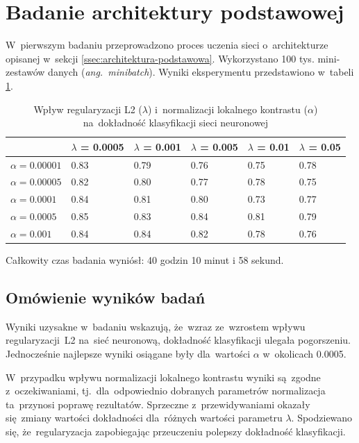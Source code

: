 \section{Badanie architektury podstawowej} \label{sec:badanie-1}
W~pierwszym badaniu przeprowadzono proces uczenia sieci o~architekturze opisanej w~sekcji
\ref{ssec:architektura-podstawowa}. Wykorzystano 100 tys. mini-zestawów danych (\textit{ang.~minibatch}).
Wyniki eksperymentu przedstawiono w~tabeli \ref{table:wyniki1}.

\begin{table}[H]
    \centering
    \begin{tabular}{|l|l|l|l|l|l|}
      \hline
                       & $\lambda$ = 0.0005 & $\lambda$ = 0.001 & $\lambda$ = 0.005 & $\lambda$ = 0.01 & $\lambda$ = 0.05 \\
      \hline
      $\alpha=0.00001$ & 0.83 & 0.79 & 0.76 & 0.75 & 0.78 \\
      \hline
      $\alpha=0.00005$ & 0.82 & 0.80 & 0.77 & 0.78 & 0.75 \\
      \hline
      $\alpha=0.0001$  & 0.84 & 0.81 & 0.80 & 0.73 & 0.77 \\
      \hline
      $\alpha=0.0005$  & 0.85 & 0.83 & 0.84 & 0.81 & 0.79 \\
      \hline
      $\alpha=0.001$   & 0.84 & 0.84 & 0.82 & 0.78 & 0.76 \\
      \hline
    \end{tabular}
    \caption{Wpływ regularyzacji L2 ($\lambda$) i~normalizacji lokalnego kontrastu ($\alpha$) na~dokładność klasyfikacji
    sieci neuronowej}
    \label{table:wyniki1}
\end{table}

Całkowity czas badania wyniósł: 40 godzin 10 minut i 58 sekund.

\subsection{Omówienie wyników badań}
Wyniki uzysakne w~badaniu wskazują, że~wzraz ze~wzrostem wpływu regularyzacji~L2 na~sieć neuronową, dokładność
klasyfikacji ulegała pogorszeniu. Jednocześnie najlepsze wyniki osiągane były dla~wartości $\alpha$ w~okolicach 0.0005.

W~przypadku wpływu normalizacji lokalnego kontrastu wyniki są~zgodne z~oczekiwaniami, tj.~dla~odpowiednio dobranych
parametrów normalizacja ta~przynosi poprawę rezultatów. Sprzeczne z~przewidywaniami okazały się~zmiany wartości
dokładności dla~różnych wartości parametru $\lambda$. Spodziewano się, że~regularyzacja zapobiegając przeuczeniu
polepszy dokładność klasyfikacji.

